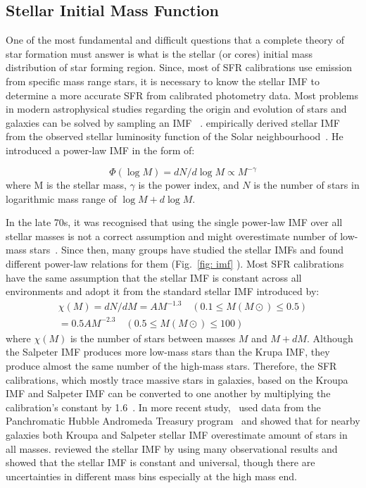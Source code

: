\subsection{Stellar Initial Mass Function}
\label{sec: imf}
One of the most fundamental and difficult questions that a complete theory of star formation must answer is what is the stellar (or cores) initial mass distribution of star forming region. 
Since, most of SFR calibrations use emission from specific mass range stars, it is necessary to know the stellar IMF to determine a more accurate SFR from calibrated photometry data. 
Most problems in modern astrophysical studies regarding the origin and evolution of stars and galaxies can be solved by sampling an IMF ~\citep{Bastin10}. 
\cite{Salpeter55} empirically derived stellar IMF from the observed stellar luminosity function of the Solar neighbourhood~\citep{Shu87}. 
He introduced a power-law IMF in the form of:

\begin{equation}
\label{equ: salp}
\Phi (\log M) = dN / d \log M \propto M^{-\gamma }
\end{equation} 
where M is the stellar mass, $\gamma$ is the power index, and $N$ is the number of stars in logarithmic mass range of $\log M + d\log M$. 

In the late 70s, it was recognised that using the single power-law IMF over all stellar masses is not a correct assumption and might overestimate number of low-mass stars~\citep{Kroupa93, Bastin10}. 
Since then, many groups have studied the stellar IMFs and found different power-law relations for them (Fig.~\ref{fig: imf} ). 
Most SFR calibrations have the same assumption that the stellar IMF is constant across all environments and adopt it from the standard stellar IMF introduced by\cite{Kroupa01}:
\begin{align}
\chi (M) = dN/dM = A M^{-1.3}    \quad    (0.1 \le M(M{\odot}) \le 0.5)\\                  
           = 0.5 A M^{-2.3}    \quad    (0.5 \le M(M{\odot}) \le 100)
\end{align}
where $\chi(M)$ is the number of stars between masses $M$ and $M+dM$. 
Although the Salpeter IMF produces more low-mass stars than the Krupa IMF, they produce almost the same number of the high-mass stars. 
Therefore, the SFR calibrations, which mostly trace massive stars in galaxies, based on the Kroupa IMF and Salpeter IMF can be converted to one another by multiplying the calibration's constant by 1.6~\citep{Calzetti13}. 
In more recent study,~\cite{Weisz15} used data from the Panchromatic Hubble Andromeda Treasury program~\citep[PHAT][]{Dalcanton12} and showed that for nearby galaxies both Kroupa and Salpeter stellar IMF overestimate amount of stars in all masses.
\cite{Bastin10} reviewed the stellar IMF by using many observational results and showed that the stellar IMF is constant and universal, though there are uncertainties in different mass bins especially at the high mass end.


